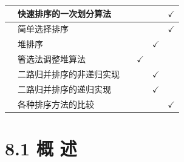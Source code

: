 \documentclass[10pt]{article}
\begin{document}
\begin{center}
\begin{tabular}{|l|l|l|l|l|l|}
\hline
 & 快速排序的一次划分算法 &  &  &  & $\checkmark$ \\
\hline
 & 简单选择排序 &  &  &  & $\checkmark$ \\
\hline
 & 堆排序 &  &  & $\checkmark$ &  \\
\hline
 & 箵选法调整堆算法 &  & $\checkmark$ &  &  \\
\hline
 & 二路归并排序的非递归实现 &  &  & $\checkmark$ &  \\
\hline
 & 二路归并排序的递归实现 &  &  & $\checkmark$ &  \\
\hline
 & 各种排序方法的比较 &  &  &  & $\checkmark$ \\
\hline
\end{tabular}
\end{center}

\section*{8.1 概 述}
\end{document}
